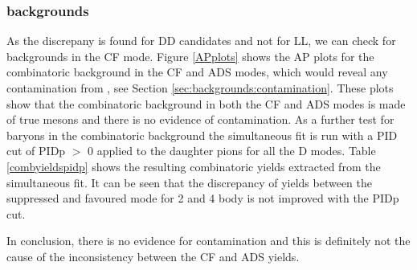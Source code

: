 \subsubsection{\KS backgrounds}

As the discrepany is found for DD candidates and not for LL, we can check for \KS backgrounds in the CF mode. Figure \ref{APplots} shows the AP plots for the combinatoric background in the CF and ADS modes, which would reveal any contamination from \Lz, see Section \ref{sec:backgrounds:contamination}. These plots show that the combinatoric background in both the CF and ADS modes is made of true \KS mesons and there is no evidence of \Lz contamination. As a further test for \Lz baryons in the combinatoric background the simultaneous fit is run with a PID cut of PIDp $>$ 0 applied to the \KS daughter pions for all the D modes. Table \ref{combyieldspidp} shows the resulting combinatoric yields extracted from the simultaneous fit. It can be seen that the discrepancy of yields between the suppressed and favoured mode for 2 and 4 body is not improved with the PIDp cut. 

In conclusion, there is no evidence for \Lz contamination and this is definitely not the cause of the inconsistency between the CF and ADS yields.

